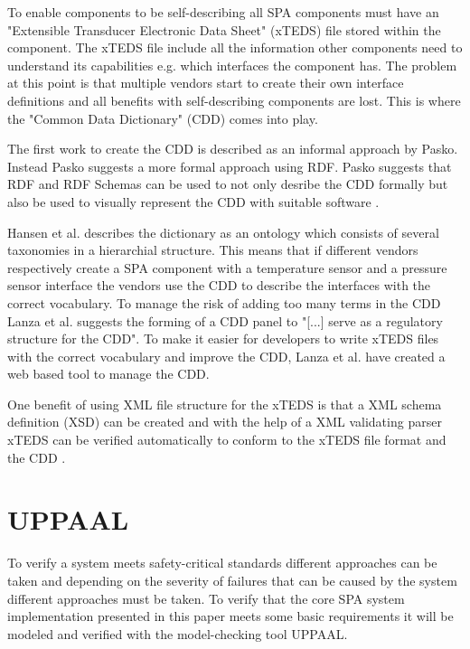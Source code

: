 
To enable components to be self-describing all SPA components must have an
"Extensible Transducer Electronic Data Sheet" (xTEDS) file stored within the
component. The xTEDS file include all the information other components need to
understand its capabilities e.g. which interfaces the component has. The
problem at this point is that multiple vendors start to create their own
interface definitions and all benefits with self-describing components are
lost. This is where the "Common Data Dictionary" (CDD) comes into play.


The first work to create the CDD is described as an informal approach by Pasko.
Instead Pasko suggests a more formal approach using RDF. Pasko suggests that
RDF and RDF Schemas can be used to not only desribe the CDD formally but also
be used to visually represent the CDD with suitable software \cite{pasko2011}.

Hansen et al. \cite{hansen2012} describes the dictionary as an ontology which
consists of several taxonomies in a hierarchial structure. This means that if
different vendors respectively create a SPA component with a temperature sensor
and a pressure sensor interface the vendors use the CDD to describe the
interfaces with the correct vocabulary. To manage the risk of adding too
many terms in the CDD Lanza et al. \cite{lanza2010} suggests the forming of a
CDD panel to "[...] serve as a regulatory structure for the CDD". To make it
easier for developers to write xTEDS files with the correct vocabulary and
improve the CDD, Lanza et al.  \cite{lanza2010} have created a web based tool
to manage the CDD.

One benefit of using XML file structure for the xTEDS is that a XML schema
definition (XSD) can be created and with the help of a XML validating parser
xTEDS can be verified automatically to conform to the xTEDS file format and the
CDD \cite{lanza2010}.


\section{UPPAAL}
To verify a system meets safety-critical standards different approaches can
be taken and depending on the severity of failures that can be caused by the
system different approaches must be taken. To verify that the core SPA system
implementation presented in this paper meets some basic requirements it will be
modeled and verified with the model-checking tool UPPAAL.

